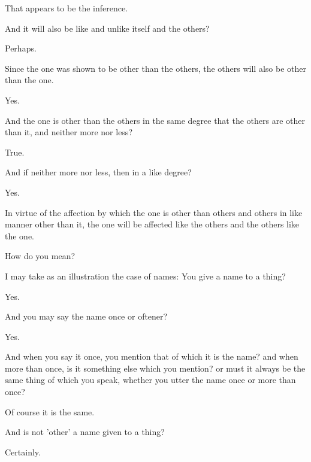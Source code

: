\documentclass[11pt,letter]{article}
\begin{document}
\par  That appears to be the inference.

\par  And it will also be like and unlike itself and the others?

\par  Perhaps.

\par  Since the one was shown to be other than the others, the others will also be other than the one.

\par  Yes.

\par  And the one is other than the others in the same degree that the others are other than it, and neither more nor less?

\par  True.

\par  And if neither more nor less, then in a like degree?

\par  Yes.

\par  In virtue of the affection by which the one is other than others and others in like manner other than it, the one will be affected like the others and the others like the one.

\par  How do you mean?

\par  I may take as an illustration the case of names: You give a name to a thing?

\par  Yes.

\par  And you may say the name once or oftener?

\par  Yes.

\par  And when you say it once, you mention that of which it is the name? and when more than once, is it something else which you mention? or must it always be the same thing of which you speak, whether you utter the name once or more than once?

\par  Of course it is the same.

\par  And is not 'other' a name given to a thing?

\par  Certainly.
\end{document}

